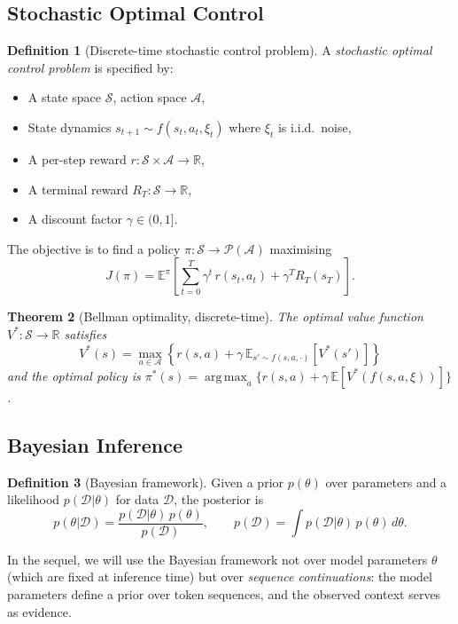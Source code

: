 \documentclass[11pt,a4paper]{article}
\theoremstyle{plain}
\newtheorem{theorem}{Theorem}[section]
\theoremstyle{definition}
\newtheorem{definition}[theorem]{Definition}
\theoremstyle{remark}
\newcommand{\R}{\mathbb{R}}
\newcommand{\E}{\mathbb{E}}
\newcommand{\cS}{\mathcal{S}}
\newcommand{\cA}{\mathcal{A}}
\newcommand{\cD}{\mathcal{D}}
\newcommand{\cP}{\mathcal{P}}
\DeclareMathOperator*{\argmax}{arg\,max}
\begin{document}
\subsection{Stochastic Optimal Control}

\begin{definition}[Discrete-time stochastic control problem]
A \emph{stochastic optimal control problem} is specified by:
\begin{itemize}[nosep]
  \item A state space $\cS$, action space $\cA$,
  \item State dynamics $s_{t+1} \sim f(s_t, a_t, \xi_t)$ where
        $\xi_t$ is i.i.d.\ noise,
  \item A per-step reward $r: \cS \times \cA \to \R$,
  \item A terminal reward $R_T: \cS \to \R$,
  \item A discount factor $\gamma \in (0,1]$.
\end{itemize}
The objective is to find a policy $\pi: \cS \to \cP(\cA)$ maximising
\[
  J(\pi) = \E^{\pi}\!\left[\sum_{t=0}^{T} \gamma^t\, r(s_t, a_t) + \gamma^T R_T(s_T)\right].
\]
\end{definition}

\begin{theorem}[Bellman optimality, discrete-time]\label{thm:bellman}
The optimal value function $V^*: \cS \to \R$ satisfies
\[
  V^*(s) = \max_{a \in \cA}\!\left\{r(s,a) + \gamma\, \E_{s' \sim f(s,a,\cdot)}[V^*(s')]\right\}
\]
and the optimal policy is $\pi^*(s) = \argmax_{a}\{r(s,a) + \gamma\,\E[V^*(f(s,a,\xi))]\}$.
\end{theorem}

\subsection{Bayesian Inference}

\begin{definition}[Bayesian framework]
Given a prior $p(\theta)$ over parameters and a likelihood $p(\cD|\theta)$ for
data $\cD$, the posterior is
\[
  p(\theta|\cD) = \frac{p(\cD|\theta)\,p(\theta)}{p(\cD)}, \qquad
  p(\cD) = \int p(\cD|\theta)\,p(\theta)\,d\theta.
\]
\end{definition}

In the sequel, we will use the Bayesian framework not over model parameters
$\theta$ (which are fixed at inference time) but over \emph{sequence
continuations}: the model parameters define a prior over token sequences, and
the observed context serves as evidence.
\end{document}
